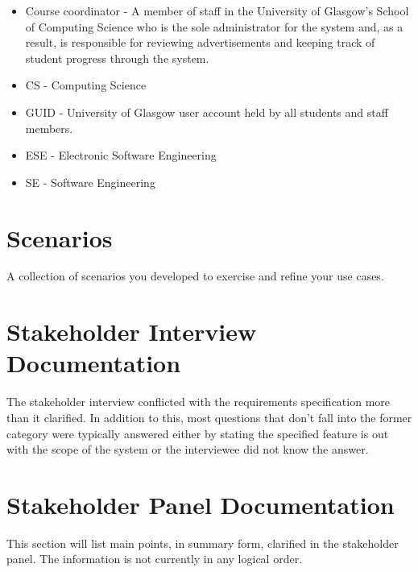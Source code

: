 \documentclass{l3deliverable}
\begin{document}
\begin{itemize}

\item Course coordinator - A member of staff in the University of Glasgow's
School of Computing Science who is the sole administrator for the system and, as
a result, is responsible for reviewing advertisements and keeping track of 
student progress through the system.

\item CS - Computing Science

\item GUID - University of Glasgow user account held by all students and staff
members.

\item ESE - Electronic Software Engineering

\item SE - Software Engineering

\end{itemize}

\section{Scenarios}

A collection of scenarios you developed to exercise and refine your
use cases.

\section{Stakeholder Interview Documentation}

The stakeholder interview conflicted with the requirements specification more
than it clarified. In addition to this, most questions that don't fall into the
former category were typically answered either by stating the specified
feature is out with the scope of the system or the interviewee did not
know the answer.

\section{Stakeholder Panel Documentation}

This section will list main points, in summary form, clarified in the
stakeholder panel. The information is not currently in any logical order.
\end{document}
